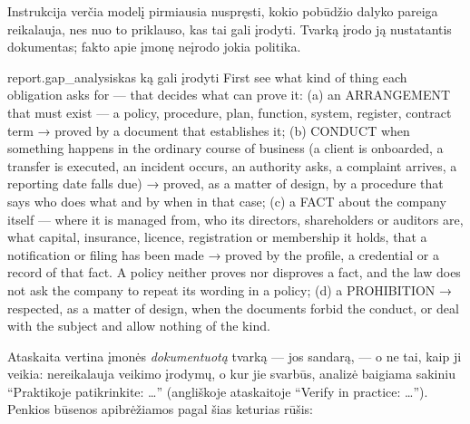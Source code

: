 Instrukcija verčia modelį pirmiausia nuspręsti, kokio pobūdžio dalyko pareiga reikalauja, nes
nuo to priklauso, kas tai gali įrodyti. Tvarką įrodo ją nustatantis dokumentas; fakto apie įmonę
neįrodo jokia politika.

\begin{promptexcerpt}{report.gap_analysis}{kas ką gali įrodyti}
  First see what kind of thing each obligation asks for — that decides what can prove
  it:
  (a) an ARRANGEMENT that must exist — a policy, procedure, plan, function, system,
    register, contract term → proved by a document that establishes it;
  (b) CONDUCT when something happens in the ordinary course of business (a client is
    onboarded, a transfer is executed, an incident occurs, an authority asks, a
    complaint arrives, a reporting date falls due) → proved, as a matter of design, by
    a procedure that says who does what and by when in that case;
  (c) a FACT about the company itself — where it is managed from, who its directors,
    shareholders or auditors are, what capital, insurance, licence, registration or
    membership it holds, that a notification or filing has been made → proved by the
    profile, a credential or a record of that fact. A policy neither proves nor
    disproves a fact, and the law does not ask the company to repeat its wording in a
    policy;
  (d) a PROHIBITION → respected, as a matter of design, when the documents forbid the
    conduct, or deal with the subject and allow nothing of the kind.
\end{promptexcerpt}

Ataskaita vertina įmonės \emph{dokumentuotą} tvarką --- jos sandarą, --- o ne tai, kaip ji
veikia:  nereikalauja veikimo įrodymų, o kur jie svarbūs, analizė baigiama sakiniu
\enquote{Praktikoje patikrinkite: \ldots} (angliškoje ataskaitoje \enquote{Verify in practice:
\ldots}). Penkios būsenos apibrėžiamos pagal šias keturias rūšis:

